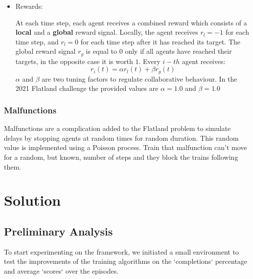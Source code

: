 \documentclass[12pt]{article}
\begin{document}
\begin{itemize}
    \item Rewards:
    
    At each time step, each agent receives a combined reward which consists of a \textbf{local} and a \textbf{global} reward signal.
    Locally, the agent receives $r_l=-1$ for each time step, and $r_l=0$ for each time step after it has reached its target.  The global reward signal $r_g$ is equal to $0$ only if all agents have reached their targets, in the opposite case it is worth $1$.
    Every $i-th$ agent receives:
    \[ r_i(t)= \alpha r_l(t) + \beta r_g(t) \]
    $\alpha$ and $\beta$ are two tuning factors to regulate collaborative behaviour. In the 2021 Flatland challenge the provided values are $\alpha = 1.0$ and $\beta = 1.0$
\end{itemize}

\subsubsection{Malfunctions}

Malfunctions are a complication added to the Flatland problem to simulate delays by stopping agents at random times for random duration. 
This random value is implemented using a Poisson process. 
Train that malfunction can’t move for a random, but known, number of steps and they block the trains following them.

\section{Solution}

\subsection{Preliminary Analysis}

To start experimenting on the framework, we initiated a small environment to test the improvements of the training algorithms on the `completions` percentage and average `scores` over the episodes.
\end{document}
